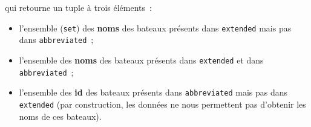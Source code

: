 \begin{Shaded}
\begin{Highlighting}[frame=lines,framerule=0.6mm,rulecolor=\color{asisframecolor}]
\end{Highlighting}
\end{Shaded}

qui retourne un tuple à trois éléments~:

\begin{itemize}
\tightlist
\item
  l'ensemble (\texttt{set}) des \textbf{noms} des bateaux présents dans
  \texttt{extended} mais pas dans \texttt{abbreviated}~;
\item
  l'ensemble des \textbf{noms} des bateaux présents dans
  \texttt{extended} et dans \texttt{abbreviated}~;
\item
  l'ensemble des \textbf{id} des bateaux présents dans
  \texttt{abbreviated} mais pas dans \texttt{extended} (par
  construction, les données ne nous permettent pas d'obtenir les noms de
  ces bateaux).
\end{itemize}

